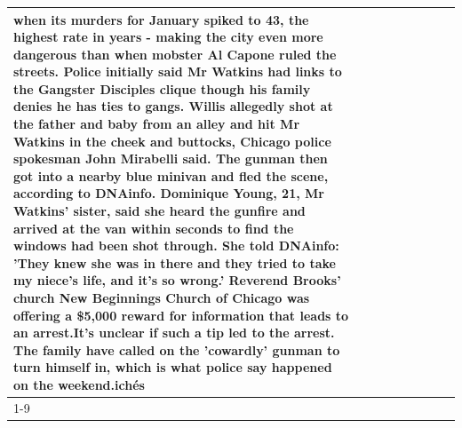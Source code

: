 \begin{table}[H]
\begin{tabular}{lllrlllll}
when its murders for January spiked to 43, the highest rate in years - making the city even more dangerous than when mobster Al Capone ruled the streets. Police initially said Mr Watkins had links to the Gangster Disciples clique though his family denies he has ties to gangs. Willis allegedly shot at the father and baby from an alley and hit Mr Watkins in the cheek and buttocks, Chicago police spokesman John Mirabelli said. The gunman then got into a nearby blue minivan and fled the scene, according to DNAinfo. Dominique Young, 21, Mr Watkins' sister, said she heard the gunfire and arrived at the van within seconds to find the windows had been shot through. She told DNAinfo: 'They knew she was in there and they tried to take my niece's life, and it's so wrong.' Reverend Brooks' church New Beginnings Church of Chicago was offering a \$5,000 reward for information that leads to an arrest.It's unclear if such a tip led to the arrest. The family have called on the 'cowardly' gunman to turn himself in, which is what police say happened on the weekend.ichés \\
\cline{1-9}

\end{tabular}
\end{table}
